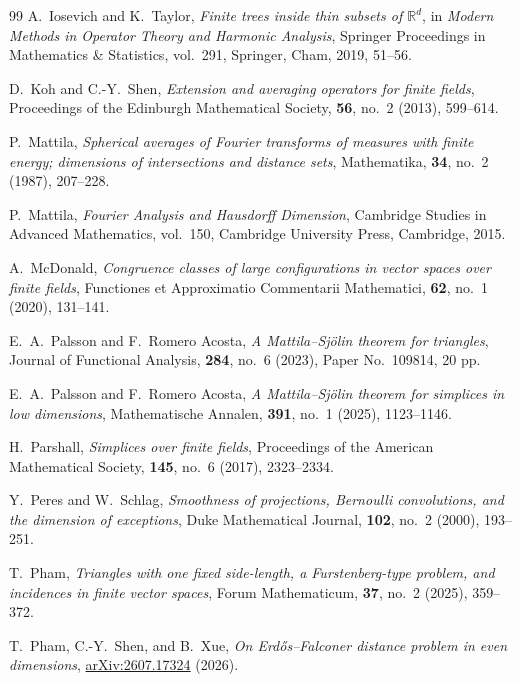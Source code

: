 \documentclass[11pt]{article}
\theoremstyle{remark}
\newcommand{\R}{\mathbb R}
\numberwithin{equation}{section}
\newcommand{\1}{\mathbf 1}
\begin{document}
\begin{thebibliography}{99}
A.~Iosevich and K.~Taylor,
\emph{Finite trees inside thin subsets of \(\R^d\)},
in \emph{Modern Methods in Operator Theory and Harmonic Analysis},
Springer Proceedings in Mathematics \& Statistics, vol.~291,
Springer, Cham, 2019, 51--56.

D.~Koh and C.-Y.~Shen,
\emph{Extension and averaging operators for finite fields},
Proceedings of the Edinburgh Mathematical Society, \textbf{56},
no.~2 (2013), 599--614.

P.~Mattila,
\emph{Spherical averages of Fourier transforms of measures with finite
energy; dimensions of intersections and distance sets},
Mathematika, \textbf{34}, no.~2 (1987), 207--228.

P.~Mattila,
\emph{Fourier Analysis and Hausdorff Dimension},
Cambridge Studies in Advanced Mathematics, vol.~150,
Cambridge University Press, Cambridge, 2015.

A.~McDonald,
\emph{Congruence classes of large configurations in vector spaces over
finite fields},
Functiones et Approximatio Commentarii Mathematici, \textbf{62},
no.~1 (2020), 131--141.

E.~A.~Palsson and F.~Romero Acosta,
\emph{A Mattila--Sj\"olin theorem for triangles},
Journal of Functional Analysis, \textbf{284}, no.~6 (2023),
Paper No.~109814, 20 pp.

E.~A.~Palsson and F.~Romero Acosta,
\emph{A Mattila--Sj\"olin theorem for simplices in low dimensions},
Mathematische Annalen, \textbf{391}, no.~1 (2025), 1123--1146.

H.~Parshall,
\emph{Simplices over finite fields},
Proceedings of the American Mathematical Society, \textbf{145},
no.~6 (2017), 2323--2334.

Y.~Peres and W.~Schlag,
\emph{Smoothness of projections, Bernoulli convolutions, and the
dimension of exceptions},
Duke Mathematical Journal, \textbf{102}, no.~2 (2000), 193--251.

T.~Pham,
\emph{Triangles with one fixed side-length, a Furstenberg-type problem,
and incidences in finite vector spaces},
Forum Mathematicum, \textbf{37}, no.~2 (2025), 359--372.

T.~Pham, C.-Y.~Shen, and B.~Xue,
\emph{On Erd\H{o}s--Falconer distance problem in even dimensions},
\href{https://arxiv.org/abs/2607.17324}{arXiv:2607.17324} (2026).


\end{thebibliography}
\end{document}

